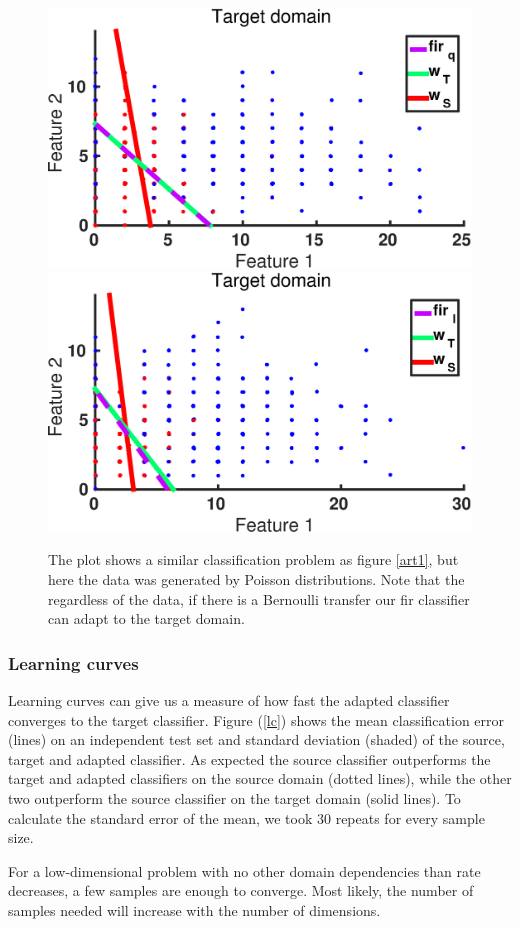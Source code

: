 \documentclass[twoside,11pt]{article}
\begin{document}
\begin{figure}[ht]
\centering
\includegraphics[width=.45\textwidth]{images/da_artexp_sens_model_convergence_Poisson_square.eps} \hspace{5px}
\includegraphics[width=.45\textwidth]{images/da_artexp_sens_model_convergence_Poisson_log.eps}
\caption{The plot shows a similar classification problem as figure \ref{art1}, but here the data was generated by Poisson distributions. Note that the regardless of the data, if there is a Bernoulli transfer our {\sc fir} classifier can adapt to the target domain.}
\label{art2}
\end{figure}

\subsubsection{Learning curves}
Learning curves can give us a measure of how fast the adapted classifier converges to the target classifier. Figure (\ref{lc}) shows the mean classification error (lines) on an independent test set and standard deviation (shaded) of the source, target and adapted classifier. As expected the source classifier outperforms the target and adapted classifiers on the source domain (dotted lines), while the other two outperform the source classifier on the target domain (solid lines). To calculate the standard error of the mean, we took 30 repeats for every sample size. 

For a low-dimensional problem with no other domain dependencies than rate decreases, a few samples are enough to converge. Most likely, the number of samples needed will increase with the number of dimensions.
\end{document}
